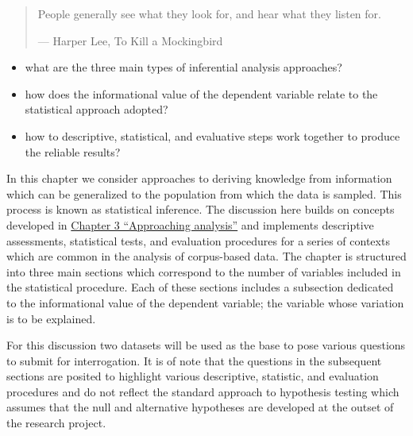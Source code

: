 \documentclass[
  letterpaper,
]{scrbook}
\providecommand{\tightlist}{%
  \setlength{\itemsep}{0pt}\setlength{\parskip}{0pt}}\usepackage{longtable,booktabs,array}
\begin{document}
\begin{quote}
People generally see what they look for, and hear what they listen for.

--- Harper Lee, To Kill a Mockingbird
\end{quote}

\begin{tcolorbox}[enhanced jigsaw, title=\textcolor{quarto-callout-note-color}{\faInfo}\hspace{0.5em}{Keys}, titlerule=0mm, toptitle=1mm, colbacktitle=quarto-callout-note-color!10!white, bottomtitle=1mm, left=2mm, colframe=quarto-callout-note-color-frame, breakable, toprule=.15mm, colback=white, opacitybacktitle=0.6, leftrule=.75mm, rightrule=.15mm, bottomrule=.15mm, arc=.35mm, coltitle=black, opacityback=0]

\begin{itemize}
\tightlist
\item
  what are the three main types of inferential analysis approaches?
\item
  how does the informational value of the dependent variable relate to
  the statistical approach adopted?
\item
  how to descriptive, statistical, and evaluative steps work together to
  produce the reliable results?
\end{itemize}

\end{tcolorbox}

In this chapter we consider approaches to deriving knowledge from
information which can be generalized to the population from which the
data is sampled. This process is known as statistical inference. The
discussion here builds on concepts developed in
\protect\hyperlink{sec-approaching-analysis}{Chapter 3 ``Approaching
analysis''} and implements descriptive assessments, statistical tests,
and evaluation procedures for a series of contexts which are common in
the analysis of corpus-based data. The chapter is structured into three
main sections which correspond to the number of variables included in
the statistical procedure. Each of these sections includes a subsection
dedicated to the informational value of the dependent variable; the
variable whose variation is to be explained.

For this discussion two datasets will be used as the base to pose
various questions to submit for interrogation. It is of note that the
questions in the subsequent sections are posited to highlight various
descriptive, statistic, and evaluation procedures and do not reflect the
standard approach to hypothesis testing which assumes that the null and
alternative hypotheses are developed at the outset of the research
project.
\end{document}

